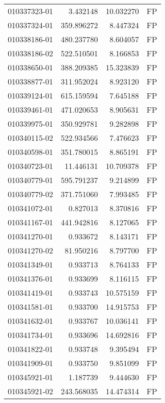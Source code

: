 \begin{tabular}{lrrl}
010337323-01 &    3.432148 &      10.032270 &   FP \\
010337324-01 &  359.896272 &       8.447324 &   FP \\
010338186-01 &  480.237780 &       8.604057 &   FP \\
010338186-02 &  522.510501 &       8.166853 &   FP \\
010338650-01 &  388.209385 &      15.323839 &   FP \\
010338877-01 &  311.952024 &       8.923120 &   FP \\
010339124-01 &  615.159594 &       7.645188 &   FP \\
010339461-01 &  471.020653 &       8.905631 &   FP \\
010339975-01 &  350.929781 &       9.282898 &   FP \\
010340115-02 &  522.934566 &       7.476623 &   FP \\
010340598-01 &  351.780015 &       8.865191 &   FP \\
010340723-01 &   11.446131 &      10.709378 &   FP \\
010340779-01 &  595.791237 &       9.214899 &   FP \\
010340779-02 &  371.751060 &       7.993485 &   FP \\
010341072-01 &    0.827013 &       8.370816 &   FP \\
010341167-01 &  441.942816 &       8.127065 &   FP \\
010341270-01 &    0.933672 &       8.143171 &   FP \\
010341270-02 &   81.950216 &       8.797700 &   FP \\
010341349-01 &    0.933713 &       8.764133 &   FP \\
010341376-01 &    0.933699 &       8.116115 &   FP \\
010341419-01 &    0.933743 &      10.575159 &   FP \\
010341581-01 &    0.933700 &      14.915753 &   FP \\
010341632-01 &    0.933767 &      10.036141 &   FP \\
010341734-01 &    0.933696 &      14.692816 &   FP \\
010341822-01 &    0.933748 &       9.395494 &   FP \\
010341909-01 &    0.933750 &       9.851099 &   FP \\
010345921-01 &    1.187739 &       9.444630 &   FP \\
010345921-02 &  243.568035 &      14.474314 &   FP \\

\end{tabular}
